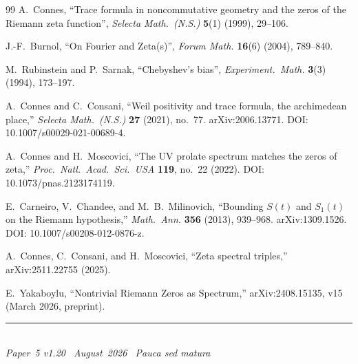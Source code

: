 \documentclass[11pt]{article}
\begin{document}
\begin{thebibliography}{99}
A.~Connes,
``Trace formula in noncommutative geometry and the zeros
of the Riemann zeta function'',
\emph{Selecta Math.\ (N.S.)} \textbf{5}(1) (1999), 29--106.

J.-F.~Burnol,
``On Fourier and Zeta(s)'',
\emph{Forum Math.} \textbf{16}(6) (2004), 789--840.

M.~Rubinstein and P.~Sarnak,
``Chebyshev's bias'',
\emph{Experiment.\ Math.} \textbf{3}(3) (1994), 173--197.

A.~Connes and C.~Consani,
``Weil positivity and trace formula, the archimedean place,''
\textit{Selecta Math.\ (N.S.)} \textbf{27} (2021), no.~77.
arXiv:2006.13771.
DOI: 10.1007/s00029-021-00689-4.

A.~Connes and H.~Moscovici,
``The UV prolate spectrum matches the zeros of zeta,''
\textit{Proc.\ Natl.\ Acad.\ Sci.\ USA}
\textbf{119}, no.~22 (2022).
DOI: 10.1073/pnas.2123174119.

E.~Carneiro, V.~Chandee, and M.~B.~Milinovich,
``Bounding $S(t)$ and $S_1(t)$ on the Riemann hypothesis,''
\textit{Math.\ Ann.} \textbf{356} (2013), 939--968.
arXiv:1309.1526.
DOI: 10.1007/s00208-012-0876-z.

A.~Connes, C.~Consani, and H.~Moscovici,
``Zeta spectral triples,''
arXiv:2511.22755 (2025).

E.~Yakaboylu,
``Nontrivial Riemann Zeros as Spectrum,''
arXiv:2408.15135, v15 (March 2026, preprint).

\end{thebibliography}

\enlargethispage{3\baselineskip}
\vspace*{\fill}
\begin{minipage}{\linewidth}
\rule{\linewidth}{0.4pt}\smallskip\\
\small\emph{Paper~5 v1.20 \textperiodcentered\ August~2026
\textperiodcentered\ Pauca sed matura}
\end{minipage}
\end{document}
